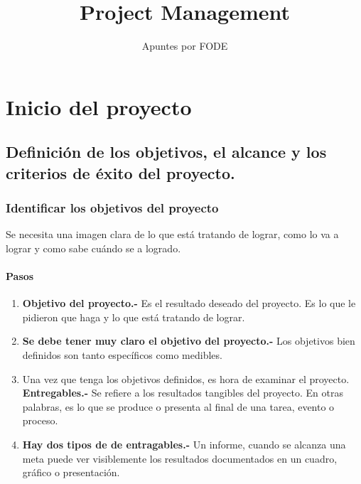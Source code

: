 \documentclass[10pt]{book}
\begin{document}
\normalfont

\author{\Large Apuntes por FODE}
\title{Project Management}
\date{}
\pagestyle{empty}
\maketitle
\thispagestyle{empty}
\let\cleardoublepage\clearpage
\tableofcontents								%


 
\let\cleardoublepage\clearpage

\part{Inicio del proyecto}

\chapter{Definición de los objetivos, el alcance y los criterios de éxito del proyecto.}

    \section{Identificar los objetivos del proyecto}
    Se necesita una imagen clara de lo que está tratando de lograr, como lo va a lograr y como sabe cuándo se a logrado.

    \subsection{Pasos}
    \begin{enumerate}[\bfseries 1.]
	\item \textbf{Objetivo del proyecto.-} Es el resultado deseado del proyecto. Es lo que le pidieron que haga y lo que está tratando de lograr.
	\item \textbf{Se debe tener muy claro el objetivo del proyecto.-} Los objetivos bien definidos son tanto específicos como medibles. 
	\item Una vez que tenga los objetivos definidos, es hora de examinar el proyecto. \textbf{Entregables.-} Se refiere a los resultados tangibles del proyecto. En otras palabras, es lo que se produce o presenta al final de una tarea, evento o proceso. 
	\item \textbf{Hay dos tipos de de entragables.-} Un informe, cuando se alcanza una meta puede ver visiblemente los resultados documentados en un cuadro, gráfico o presentación. 
    \end{enumerate}
\end{document}

